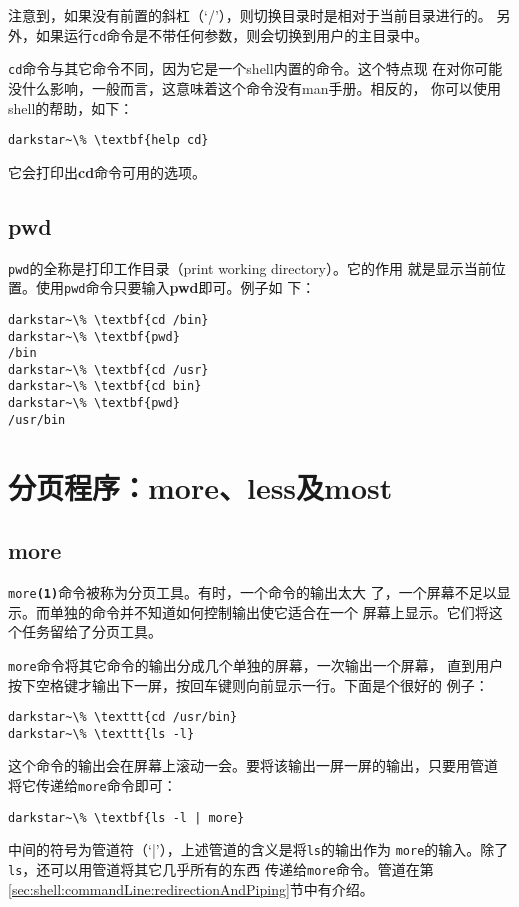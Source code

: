 注意到，如果没有前置的斜杠（`/'），则切换目录时是相对于当前目录进行的。
另外，如果运行\texttt{cd}命令是不带任何参数，则会切换到用户的主目录中。

\texttt{cd}命令与其它命令不同，因为它是一个shell内置的命令。这个特点现
在对你可能没什么影响，一般而言，这意味着这个命令没有man手册。相反的，
你可以使用shell的帮助，如下：
\begin{Verbatim}[frame=single,commandchars=\\\{\}]
darkstar~\% \textbf{help cd}
\end{Verbatim}
它会打印出\textbf{cd}命令可用的选项。

\subsection{pwd}
\label{sec:handlingFilesAndDirectories:navigation:cd}
\texttt{pwd}的全称是打印工作目录（print working directory）。它的作用
就是显示当前位置。使用\texttt{pwd}命令只要输入\textbf{pwd}即可。例子如
下：
\begin{Verbatim}[frame=single,commandchars=\\\{\}]
darkstar~\% \textbf{cd /bin}
darkstar~\% \textbf{pwd}
/bin
darkstar~\% \textbf{cd /usr}
darkstar~\% \textbf{cd bin}
darkstar~\% \textbf{pwd}
/usr/bin
\end{Verbatim}

\section{分页程序：more、less及most}
\label{sec:handlingFilesAndDirectories:pagers}

\subsection{more}
\label{sec:handlingFilesAndDirectories:pagers:more}
\texttt{more\textbf{(1)}}命令被称为分页工具。有时，一个命令的输出太大
了，一个屏幕不足以显示。而单独的命令并不知道如何控制输出使它适合在一个
屏幕上显示。它们将这个任务留给了分页工具。

\texttt{more}命令将其它命令的输出分成几个单独的屏幕，一次输出一个屏幕，
直到用户按下空格键才输出下一屏，按回车键则向前显示一行。下面是个很好的
例子：
\begin{Verbatim}[frame=single,commandchars=\\\{\}]
darkstar~\% \texttt{cd /usr/bin}
darkstar~\% \texttt{ls -l}
\end{Verbatim}

这个命令的输出会在屏幕上滚动一会。要将该输出一屏一屏的输出，只要用管道
将它传递给\texttt{more}命令即可：
\begin{Verbatim}[frame=single,commandchars=\\\{\}]
darkstar~\% \textbf{ls -l | more}
\end{Verbatim}
中间的符号为管道符（`|'），上述管道的含义是将\texttt{ls}的输出作为
\texttt{more}的输入。除了\texttt{ls}，还可以用管道将其它几乎所有的东西
传递给\texttt{more}命令。管道在第
\ref{sec:shell:commandLine:redirectionAndPiping}节中有介绍。

